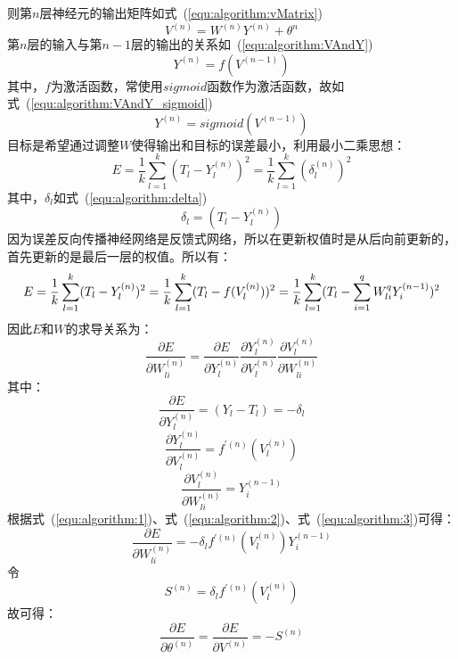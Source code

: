 则第$n$层神经元的输出矩阵如式~(\ref{equ:algorithm:vMatrix})
\begin{equation}
\label{equ:algorithm:vMatrix}
V^{(n)}=W^{(n)}Y^{(n)}+\theta^{n}
\end{equation}
第$n$层的输入与第$n-1$层的输出的关系如~(\ref{equ:algorithm:VAndY})
\begin{equation}
\label{equ:algorithm:VAndY}
Y^{(n)}=f(V^{(n-1)})
\end{equation}
其中，$f$为激活函数，常使用$sigmoid$函数作为激活函数，故如式~(\ref{equ:algorithm:VAndY_sigmoid})
\begin{equation}
\label{equ:algorithm:VAndY_sigmoid}
Y^{(n)}=sigmoid(V^{(n-1)})
\end{equation}
目标是希望通过调整$W$使得输出和目标的误差最小，利用最小二乘思想：
\begin{equation}
E = \frac{1}{k}\sum_{l=1}^k(T_l-Y_l^{(n)})^2 =  \frac{1}{k}\sum_{l=1}^k(\delta_l^{(n)})^2
\end{equation}
其中，$\delta_l$如式~(\ref{equ:algorithm:delta})
\begin{equation}
\label{equ:algorithm:delta}
\delta_l = (T_l-Y_l^{(n)})
\end{equation}
因为误差反向传播神经网络是反馈式网络，所以在更新权值时是从后向前更新的，首先更新的是最后一层的权值。所以有：
\begin{equation}
E = \frac{1}{k}\sum_{l=1}^k(T_l-Y_l^{(n)})^2 \\
= \frac{1}{k}\sum_{l=1}^k(T_l-f(V_l^{(n)}) )^2 \\
= \frac{1}{k}\sum_{l=1}^k(T_l-\sum_{i=1}^{q}W_{li}^{q}Y_i^{(n-1)})^2
\end{equation}
因此$E$和$W$的求导关系为：
\begin{equation}
\frac{\partial E}{\partial W_{li}^{(n)}} = \frac{\partial E}{\partial Y_l^{(n)}}\frac{\partial Y_l^{(n)}}{\partial V_l^{(n)}}\frac{\partial V_l^{(n)}}{\partial W_{li}^{(n)}}
\end{equation}
其中：
\begin{equation}
\label{equ:algorithm:1}
\frac{\partial E}{\partial Y_l^{(n)}} = (Y_l-T_l) = -\delta_l 
\end{equation}
\begin{equation}
\label{equ:algorithm:2}
\frac{\partial Y_l^{(n)}}{\partial V_l^{(n)}} = f^{'(n)}(V_l^{(n)})
\end{equation}
\begin{equation}
\label{equ:algorithm:3}
\frac{\partial V_l^{(n)}}{\partial W_{li}^{(n)}} = Y_i^{(n-1)}
\end{equation}
根据式~(\ref{equ:algorithm:1})、式~(\ref{equ:algorithm:2})、式~(\ref{equ:algorithm:3})可得：
\begin{equation}
\frac{\partial E}{\partial W_{li}^{(n)}}=-\delta_l f^{'(n)}(V_l^{(n)})  Y_i^{(n-1)}
\end{equation}
令
\begin{equation}
S^{(n)}=\delta_l f^{'(n)}(V_l^{(n)}) 
\end{equation}
故可得：
\begin{equation}
\label{key}
\frac{\partial E}{\partial \theta^{(n)}}=\frac{\partial E}{\partial V^{(n)}}=-S^{(n)}
\end{equation}


